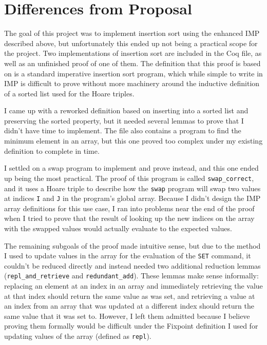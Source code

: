 \documentclass{article}
\begin{document}
    \section{Differences from Proposal}
    The goal of this project was to implement insertion sort using the enhanced IMP described above, but unfortunately this ended up not being a practical scope for the project. Two implementations of insertion sort are included in the Coq file, as well as an unfinished proof of one of them. The definition that this proof is based on is a standard imperative insertion sort program, which while simple to write in IMP is difficult to prove without more machinery around the inductive definition of a sorted list used for the Hoare triples.

    I came up with a reworked definition based on inserting into a sorted list and preserving the sorted property, but it needed several lemmas to prove that I didn't have time to implement. The file also contains a program to find the minimum element in an array, but this one proved too complex under my existing definition to complete in time.

    I settled on a swap program to implement and prove instead, and this one ended up being the most practical. The proof of this program is called \texttt{swap\_correct}, and it uses a Hoare triple to describe how the \texttt{swap} program will swap two values at indices \texttt{I} and \texttt{J} in the program's global array. Because I didn't design the IMP array definitions for this use case, I ran into problems near the end of the proof when I tried to prove that the result of looking up the new indices on the array with the swapped values would actually evaluate to the expected values.

    The remaining subgoals of the proof made intuitive sense, but due to the method I used to update values in the array for the evaluation of the \texttt{SET} command, it couldn't be reduced directly and instead needed two additional reduction lemmas (\texttt{repl\_and\_retrieve} and \texttt{redundant\_add}). These lemmas make sense informally: replacing an element at an index in an array and immediately retrieving the value at that index should return the same value as was set, and retrieving a value at an index from an array that was updated at a different index should return the same value that it was set to. However, I left them admitted because I believe proving them formally would be difficult under the Fixpoint definition I used for updating values of the array (defined as \texttt{repl}).
    
\end{document}
